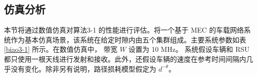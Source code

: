 \subsection{仿真分析}\label{section3-4-2}
本节将通过数值仿真对算法3-1 的性能进行评估。将一个基于 MEC 的车载网络系统作为基本仿真场景，该系统在给定时隙内由五个集群组成。主要系统参数如表 \ref{biao3-1} 所示。在数值仿真中，
带宽 $W$ 设置为 10 MHz。 系统假设车辆和 RSU 都只使用一根天线进行发射和接收。此外，还假设车辆的速度在参考时间间隔内几乎没有变化。除非另有说明，路径损耗模型假定为 $d^{-\theta}$。

